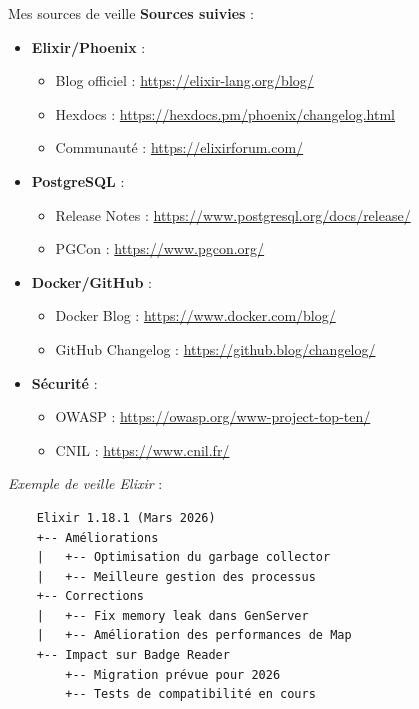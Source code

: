 \begin{for_you}{Mes sources de veille}
    \textbf{Sources suivies} :
    \begin{itemize}
        \item \textbf{Elixir/Phoenix} :
              \begin{itemize}
                  \item Blog officiel : \url{https://elixir-lang.org/blog/}
                  \item Hexdocs : \url{https://hexdocs.pm/phoenix/changelog.html}
                  \item Communauté : \url{https://elixirforum.com/}
              \end{itemize}
        \item \textbf{PostgreSQL} :
              \begin{itemize}
                  \item Release Notes : \url{https://www.postgresql.org/docs/release/}
                  \item PGCon : \url{https://www.pgcon.org/}
              \end{itemize}
        \item \textbf{Docker/GitHub} :
              \begin{itemize}
                  \item Docker Blog : \url{https://www.docker.com/blog/}
                  \item GitHub Changelog : \url{https://github.blog/changelog/}
              \end{itemize}
        \item \textbf{Sécurité} :
              \begin{itemize}
                  \item OWASP : \url{https://owasp.org/www-project-top-ten/}
                  \item CNIL : \url{https://www.cnil.fr/}
                  \newline
              \end{itemize}
    \end{itemize}

    \textit{Exemple de veille Elixir} :
    \begin{verbatim}
    Elixir 1.18.1 (Mars 2026)
    +-- Améliorations
    |   +-- Optimisation du garbage collector
    |   +-- Meilleure gestion des processus
    +-- Corrections
    |   +-- Fix memory leak dans GenServer
    |   +-- Amélioration des performances de Map
    +-- Impact sur Badge Reader
        +-- Migration prévue pour 2026
        +-- Tests de compatibilité en cours
    \end{verbatim}
\end{for_you}

